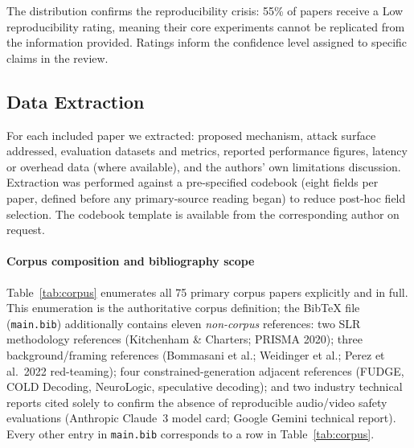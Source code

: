 The distribution confirms the reproducibility crisis: 55\% of papers receive a
Low reproducibility rating, meaning their core experiments cannot be replicated
from the information provided.
Ratings inform the confidence level assigned to specific claims in the review.

\subsection{Data Extraction}

For each included paper we extracted: proposed mechanism, attack surface addressed,
evaluation datasets and metrics, reported performance figures, latency or overhead data
(where available), and the authors' own limitations discussion.
Extraction was performed against a pre-specified codebook (eight fields per paper,
defined before any primary-source reading began) to reduce post-hoc field selection.
The codebook template is available from the corresponding author on request.

\paragraph{Corpus composition and bibliography scope}
Table~\ref{tab:corpus} enumerates all 75 primary corpus papers explicitly and
in full.
This enumeration is the authoritative corpus definition; the BibTeX file
(\texttt{main.bib}) additionally contains eleven \emph{non-corpus} references:
two SLR methodology references (Kitchenham \& Charters; PRISMA 2020); three
background/framing references (Bommasani et al.; Weidinger et al.; Perez et al.\
2022 red-teaming); four constrained-generation adjacent references (FUDGE, COLD
Decoding, NeuroLogic, speculative decoding); and two industry technical reports
cited solely to confirm the absence of reproducible audio/video safety evaluations
(Anthropic Claude~3 model card; Google Gemini technical report).
Every other entry in \texttt{main.bib} corresponds to a row in
Table~\ref{tab:corpus}.


